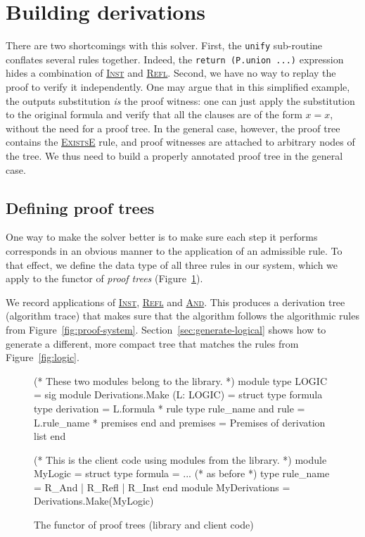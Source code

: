 \documentclass{easychair}
\def\li{\lstinline}
\let\TirName\textsc
\renewcommand{\DefTirName}[1]{\hyperlink{#1}{\TirName {#1}}}
\let\Rule\DefTirName
\newcommand{\fref}[1]{Figure~\ref{fig:#1}}
\newcommand{\sref}[1]{Section~\ref{sec:#1}}
\begin{document}
\section{Building derivations}
\label{sec:derivations}

There are two shortcomings with this solver. First, the \li+unify+ sub-routine
conflates several rules together. Indeed, the \li+return (P.union ...)+
expression hides a combination of \Rule{Inst} and \Rule{Refl}. Second, we
have no way to replay the proof to verify it independently. One may argue that
in this simplified example, the outputs substitution \emph{is} the proof
witness: one can just apply the substitution to the original
formula and verify that all the clauses are of the form $x = x$, without the
need for a proof tree. In the general case, however, the proof tree contains the
\Rule{ExistsE} rule, and proof witnesses are attached to arbitrary nodes of the
tree. We thus need to build a properly annotated proof tree in the general case.

\subsection{Defining proof trees}

One way to make the solver better is to make sure each step it performs
corresponds in an obvious manner to the application of an admissible rule. To
that effect, we define the data type of all three rules in our system, which we
apply to the functor of \emph{proof trees} (\fref{proof-trees}).

We record applications of \Rule{Inst}, \Rule{Refl} and \Rule{And}. This produces
a derivation tree (algorithm trace) that makes sure that the algorithm follows
the algorithmic rules from \fref{proof-system}. \sref{generate-logical} shows
how to generate a different, more compact tree that matches the rules from
\fref{logic}.

\begin{figure}
  \centering
\begin{ocaml}
(* These two modules belong to the library. *)
module type LOGIC = sig     module Derivations.Make (L: LOGIC) = struct
  type formula                type derivation = L.formula * rule
  type rule_name              and rule = L.rule_name * premises
end                           and premises = Premises of derivation list
                            end

(* This is the client code using modules from the library. *)
module MyLogic = struct
  type formula = ... (* as before *)
  type rule_name = R_And | R_Refl | R_Inst
end
module MyDerivations = Derivations.Make(MyLogic)
\end{ocaml}
  \caption{The functor of proof trees (library and client code)}
  \label{fig:proof-trees}
\end{figure}
\end{document}
